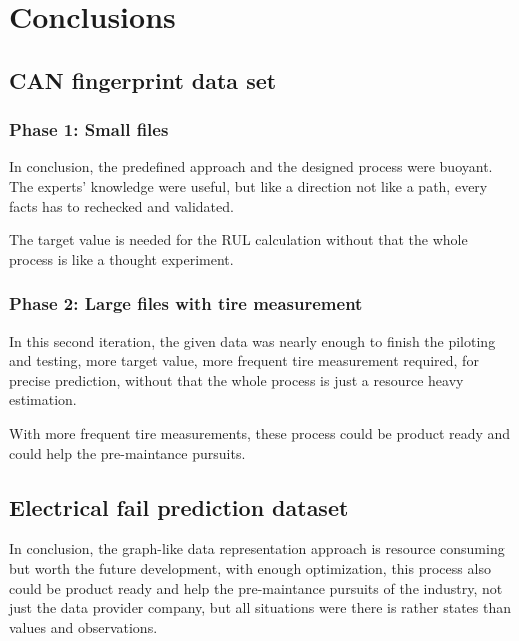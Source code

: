 \chapter{Conclusions}
\section{CAN fingerprint data set}
\subsection{Phase 1: Small files}
In conclusion, the predefined approach and the designed process were buoyant. The experts' knowledge were useful, but like a direction not like a path, every facts has to rechecked and validated.

The target value is needed for the RUL calculation without that the whole process is like a thought experiment. 
\subsection{Phase 2: Large files with tire measurement}
In this second iteration, the given data was nearly enough to finish the piloting and testing, more target value, more frequent tire measurement required, for precise prediction, without that the whole process is just a resource heavy estimation.

With more frequent tire measurements, these process could be product ready and could help the pre-maintance pursuits.

\section{Electrical fail prediction dataset}

In conclusion, the graph-like data representation approach is resource consuming but worth the future development, with enough optimization, this process also could be product ready and help the pre-maintance pursuits of the industry, not just the data provider company, but all situations were there is rather states than values and observations.

